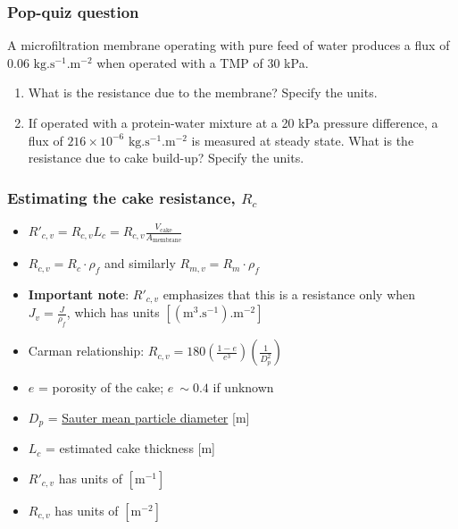 \begin{frame}\frametitle{Pop-quiz question}
	A microfiltration membrane operating with pure feed of water produces a flux of 0.06 $\text{kg}.\text{s}^{-1}\text{.m}^{-2}$ when operated with a TMP of 30 kPa.
	
	\begin{enumerate}
		\item	What is the resistance due to the membrane? Specify the units.
		\item	If operated with a protein-water mixture at a 20 kPa pressure difference, a flux of $216 \times 10^{-6}$ $\text{kg}.\text{s}^{-1}\text{.m}^{-2}$ is measured at steady state. What is the resistance due to cake build-up? Specify the units.
	\end{enumerate}
\end{frame}

\begin{frame}\frametitle{Estimating the cake resistance, $R_c$}
	\begin{itemize}		
		\item	$R'_{c,v} = R_{c,v} L_c = R_{c,v} \displaystyle\frac{V_\text{cake}}{A_\text{membrane}}$
		\item	$R_{c,v} = R_{c} \cdot \rho_f$ and similarly $R_{m,v} = R_{m} \cdot \rho_f$
		\item	\textbf{Important note}: $R'_{c,v}$ emphasizes that this is a resistance only when $J_v = \displaystyle\frac{J}{\rho_f}$, which has units $\left[\left(\text{m}^3.\text{s}^{-1}\right)\text{.m}^{-2}\right]$
		\item	Carman relationship: $R_{c,v} = 180 \left( \displaystyle \frac{1-e}{e^3} \right)\left(\displaystyle \frac{1}{D_p^2} \right)$ 
		\item	$e$ = porosity of the cake; $e ~\sim 0.4$ if unknown
		\item	$D_p$ = \href{http://en.wikipedia.org/wiki/Sauter_mean_diameter}{Sauter mean particle diameter} [m]
		\item	$L_c$ = estimated cake thickness [m]
		\item	$R'_{c,v}$ has units of $[\text{m}^{-1}]$
		\item	$R_{c,v}$ has units of $[\text{m}^{-2}]$
	\end{itemize}
\end{frame}

